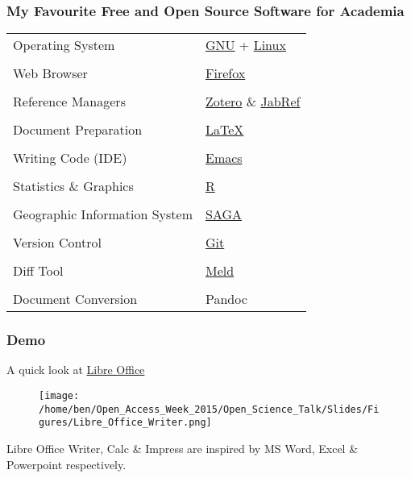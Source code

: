 \documentclass[xcolor=dvipsnames]{beamer}
\begin{document}
\begin{frame}
\frametitle{My Favourite Free and Open Source Software for Academia}
\begin{tabular}{ll}
Operating System              & \href{https://www.gnu.org/}{GNU} + \href{https://kernel.org/}{Linux} \\
                              & \\
Web Browser                   & \href{https://www.mozilla.org}{Firefox} \\
                              & \\
Reference Managers            &  \href{https://www.zotero.org/}{Zotero} \& \href{http://jabref.sourceforge.net/}{JabRef} \\
                              & \\
Document Preparation          & \href{https://www.latex-project.org/}{LaTeX} \\
                              & \\
Writing Code (IDE)            & \href{https://www.gnu.org/software/emacs/}{Emacs} \\
                              & \\
Statistics \& Graphics        & \href{https://cran.r-project.org/}{R} \\
                              & \\
Geographic Information System & \href{http://www.saga-gis.org/en/index.html}{SAGA} \\
                              & \\
Version Control               & \href{https://git-scm.com/}{Git} \\
                              & \\
Diff Tool                     & \href{http://meldmerge.org/}{Meld} \\
                              & \\
Document Conversion           & Pandoc \\
\end{tabular}

\end{frame}

\begin{frame}
\frametitle{Demo}
A quick look at \href{https://www.libreoffice.org/}{Libre Office}
\begin{center}
\begin{figure}
\texttt{[image: /home/ben/Open\_Access\_Week\_2015/Open\_Science\_Talk/Slides/Figures/Libre\_Office\_Writer.png]}
\end{figure}
\end{center}
Libre Office Writer, Calc \& Impress are inspired by MS Word, Excel \& Powerpoint respectively.
\end{frame}
\end{document}
